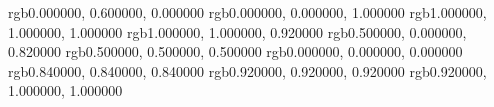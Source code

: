 
\definecolor{CommentColor}                    {rgb}{0.000000, 0.600000, 0.000000}
 \definecolor{KeywordStyleColor}               {rgb}{0.000000, 0.000000, 1.000000}
 \definecolor{ListingBgColor}                  {rgb}{1.000000, 1.000000, 1.000000}
 \definecolor{ListingFrameColor}               {rgb}{1.000000, 1.000000, 0.920000}
 \definecolor{LiteralStringColor}              {rgb}{0.500000, 0.000000, 0.820000}
 \definecolor{NumStyleColor}                   {rgb}{0.500000, 0.500000, 0.500000}
 \definecolor{RuleColor}                       {rgb}{0.000000, 0.000000, 0.000000}
 \definecolor{RuleSepColor}                    {rgb}{0.840000, 0.840000, 0.840000}
 \definecolor{ShadowBoxFrameColor}             {rgb}{0.920000, 0.920000, 0.920000}
 \definecolor{ShadowBoxColor}                  {rgb}{0.920000, 1.000000, 1.000000}

